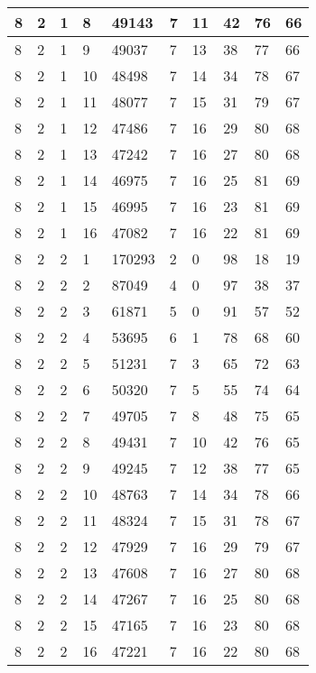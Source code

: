 \begin{table}[!ht]
\begin{tabular}{|l|l|l|l|l|l|l|l|l|l|}
        8 & 2 & 1 & 8 & 49143 & 7 & 11 & 42 & 76 & 66 \\ \hline
        8 & 2 & 1 & 9 & 49037 & 7 & 13 & 38 & 77 & 66 \\ \hline
        8 & 2 & 1 & 10 & 48498 & 7 & 14 & 34 & 78 & 67 \\ \hline
        8 & 2 & 1 & 11 & 48077 & 7 & 15 & 31 & 79 & 67 \\ \hline
        8 & 2 & 1 & 12 & 47486 & 7 & 16 & 29 & 80 & 68 \\ \hline
        8 & 2 & 1 & 13 & 47242 & 7 & 16 & 27 & 80 & 68 \\ \hline
        8 & 2 & 1 & 14 & 46975 & 7 & 16 & 25 & 81 & 69 \\ \hline
        8 & 2 & 1 & 15 & 46995 & 7 & 16 & 23 & 81 & 69 \\ \hline
        8 & 2 & 1 & 16 & 47082 & 7 & 16 & 22 & 81 & 69 \\ \hline
        8 & 2 & 2 & 1 & 170293 & 2 & 0 & 98 & 18 & 19 \\ \hline
        8 & 2 & 2 & 2 & 87049 & 4 & 0 & 97 & 38 & 37 \\ \hline
        8 & 2 & 2 & 3 & 61871 & 5 & 0 & 91 & 57 & 52 \\ \hline
        8 & 2 & 2 & 4 & 53695 & 6 & 1 & 78 & 68 & 60 \\ \hline
        8 & 2 & 2 & 5 & 51231 & 7 & 3 & 65 & 72 & 63 \\ \hline
        8 & 2 & 2 & 6 & 50320 & 7 & 5 & 55 & 74 & 64 \\ \hline
        8 & 2 & 2 & 7 & 49705 & 7 & 8 & 48 & 75 & 65 \\ \hline
        8 & 2 & 2 & 8 & 49431 & 7 & 10 & 42 & 76 & 65 \\ \hline
        8 & 2 & 2 & 9 & 49245 & 7 & 12 & 38 & 77 & 65 \\ \hline
        8 & 2 & 2 & 10 & 48763 & 7 & 14 & 34 & 78 & 66 \\ \hline
        8 & 2 & 2 & 11 & 48324 & 7 & 15 & 31 & 78 & 67 \\ \hline
        8 & 2 & 2 & 12 & 47929 & 7 & 16 & 29 & 79 & 67 \\ \hline
        8 & 2 & 2 & 13 & 47608 & 7 & 16 & 27 & 80 & 68 \\ \hline
        8 & 2 & 2 & 14 & 47267 & 7 & 16 & 25 & 80 & 68 \\ \hline
        8 & 2 & 2 & 15 & 47165 & 7 & 16 & 23 & 80 & 68 \\ \hline
        8 & 2 & 2 & 16 & 47221 & 7 & 16 & 22 & 80 & 68 \\ \hline

\end{tabular}
\end{table}
